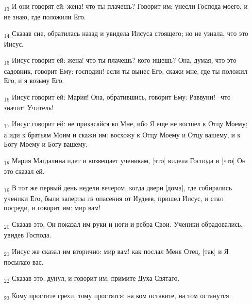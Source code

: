 \begin{tcolorbox}
\textsubscript{13} И они говорят ей: жена! что ты плачешь? Говорит им: унесли Господа моего, и не знаю, где положили Его.
\end{tcolorbox}
\begin{tcolorbox}
\textsubscript{14} Сказав сие, обратилась назад и увидела Иисуса стоящего; но не узнала, что это Иисус.
\end{tcolorbox}
\begin{tcolorbox}
\textsubscript{15} Иисус говорит ей: жена! что ты плачешь? кого ищешь? Она, думая, что это садовник, говорит Ему: господин! если ты вынес Его, скажи мне, где ты положил Его, и я возьму Его.
\end{tcolorbox}
\begin{tcolorbox}
\textsubscript{16} Иисус говорит ей: Мария! Она, обратившись, говорит Ему: Раввуни! --что значит: Учитель!
\end{tcolorbox}
\begin{tcolorbox}
\textsubscript{17} Иисус говорит ей: не прикасайся ко Мне, ибо Я еще не восшел к Отцу Моему; а иди к братьям Моим и скажи им: восхожу к Отцу Моему и Отцу вашему, и к Богу Моему и Богу вашему.
\end{tcolorbox}
\begin{tcolorbox}
\textsubscript{18} Мария Магдалина идет и возвещает ученикам, [что] видела Господа и [что] Он это сказал ей.
\end{tcolorbox}
\begin{tcolorbox}
\textsubscript{19} В тот же первый день недели вечером, когда двери [дома], где собирались ученики Его, были заперты из опасения от Иудеев, пришел Иисус, и стал посреди, и говорит им: мир вам!
\end{tcolorbox}
\begin{tcolorbox}
\textsubscript{20} Сказав это, Он показал им руки и ноги и ребра Свои. Ученики обрадовались, увидев Господа.
\end{tcolorbox}
\begin{tcolorbox}
\textsubscript{21} Иисус же сказал им вторично: мир вам! как послал Меня Отец, [так] и Я посылаю вас.
\end{tcolorbox}
\begin{tcolorbox}
\textsubscript{22} Сказав это, дунул, и говорит им: примите Духа Святаго.
\end{tcolorbox}
\begin{tcolorbox}
\textsubscript{23} Кому простите грехи, тому простятся; на ком оставите, на том останутся.
\end{tcolorbox}
